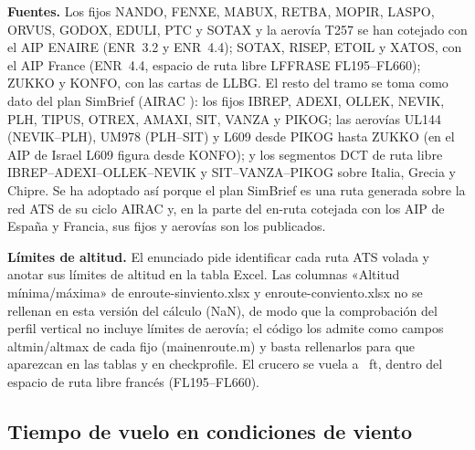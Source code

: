 \documentclass[11pt,a4paper]{article}
\DeclareRobustCommand{\m}[1]{{\ttfamily\def\_{\textunderscore\penalty100\relax}#1}}
\begin{document}
\textbf{Fuentes.} Los fijos NANDO, FENXE, MABUX, RETBA, MOPIR, LASPO, ORVUS, GODOX, EDULI, PTC y SOTAX y la aerovía T257 se han cotejado con el AIP ENAIRE (ENR~3.2 y ENR~4.4); SOTAX, RISEP, ETOIL y XATOS, con el AIP France (ENR~4.4, espacio de ruta libre LFFRASE FL195--FL660); ZUKKO y KONFO, con las cartas de LLBG. El resto del tramo se toma como dato del plan SimBrief (AIRAC \sbAirac): los fijos IBREP, ADEXI, OLLEK, NEVIK, PLH, TIPUS, OTREX, AMAXI, SIT, VANZA y PIKOG; las aerovías UL144 (NEVIK--PLH), UM978 (PLH--SIT) y L609 desde PIKOG hasta ZUKKO (en el AIP de Israel L609 figura desde KONFO); y los segmentos DCT de ruta libre IBREP--ADEXI--OLLEK--NEVIK y SIT--VANZA--PIKOG sobre Italia, Grecia y Chipre. Se ha adoptado así porque el plan SimBrief es una ruta generada sobre la red ATS de su ciclo AIRAC y, en la parte del en-ruta cotejada con los AIP de España y Francia, sus fijos y aerovías son los publicados.

\textbf{Límites de altitud.} El enunciado pide identificar cada ruta ATS volada y anotar sus límites de altitud en la tabla Excel. Las columnas «Altitud mínima/máxima» de \m{enroute-sinviento.xlsx} y \m{enroute-conviento.xlsx} no se rellenan en esta versión del cálculo (\m{NaN}), de modo que la comprobación del perfil vertical no incluye límites de aerovía; el código los admite como campos \m{alt\_min}/\m{alt\_max} de cada fijo (\m{main\_enroute.m}) y basta rellenarlos para que aparezcan en las tablas y en \m{check\_profile}. El crucero se vuela a \vHcru~ft, dentro del espacio de ruta libre francés (FL195--FL660).

\subsection{Tiempo de vuelo en condiciones de viento}\label{sec:viento}
\end{document}
